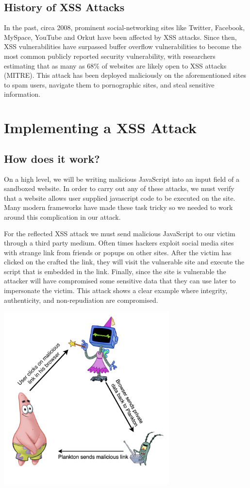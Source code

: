 \documentclass[conference]{IEEEtran}
\begin{document}
\subsection{History of XSS Attacks}
In the past, circa 2008, prominent social-networking sites like Twitter, Facebook, MySpace, YouTube and Orkut have been affected by XSS attacks. Since then, XSS vulnerabilities have surpassed buffer overflow vulnerabilities to become the most common publicly reported security vulnerability, with researchers estimating that as many as 68\% of websites are likely open to XSS attacks (MITRE). This attack has been deployed maliciously on the aforementioned sites to spam users, navigate them to pornographic sites, and steal sensitive information.

\section{Implementing a XSS Attack}
\subsection{How does it work?}
On a high level, we will be writing malicious JavaScript into an input field of a sandboxed website. In order to carry out any of these attacks, we must verify that a website allows user supplied javascript code to be executed on the site. Many modern frameworks have made these task tricky so we needed to work around this complication in our attack. 

For the reflected XSS attack we must send malicious JavaScript to our victim through a third party medium. Often times hackers exploit social media sites with strange link from friends or popups on other sites. After the victim has clicked on the crafted the link, they will visit the vulnerable site and execute the script that is embedded in the link. Finally, since the site is vulnerable the attacker will have compromised some sensitive data that they can use later to impersonate the victim. This attack shows a clear example where integrity, authenticity, and non-repudiation are compromised.

\includegraphics[width = 9cm]{reflected1.png}
\end{document}
